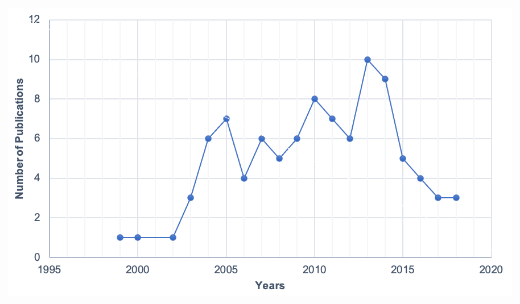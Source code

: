 \documentclass[10pt,a4paper]{article}
\begin{document}
\noindent \begin{minipage}{\columnwidth}
\centering
\resizebox{0.85\columnwidth}{!}
{\includegraphics[width=1\textwidth]{Fig1.png}}
\label{Fig1}
\end{minipage}
\vspace{\baselineskip}
\end{document}
